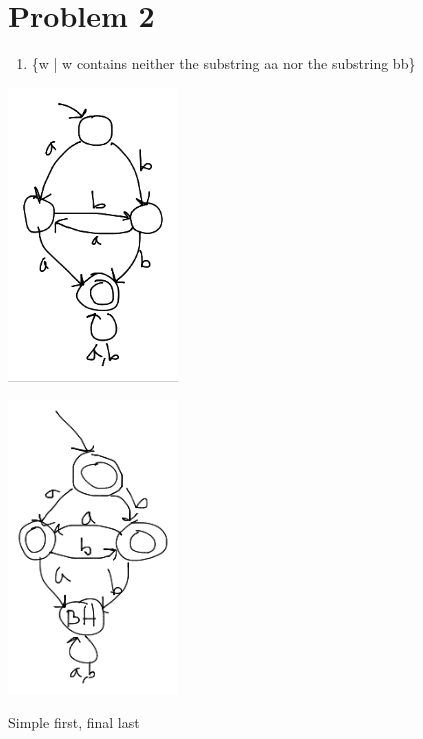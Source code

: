 \documentclass[letterpaper, 12pt]{article}
\begin{document}
\section{Problem 2}
\label{sec:org08ec323}
\begin{enumerate}
\item \{w | w contains neither the substring aa nor the substring bb\}
\end{enumerate}
\begin{center}
\includegraphics[width=4.5cm]{hw2/simple2-1.png}
\end{center}
\begin{center}
\includegraphics[width=4.5cm]{hw2/2-1.png}
\end{center}
Simple first, final last
\end{document}

